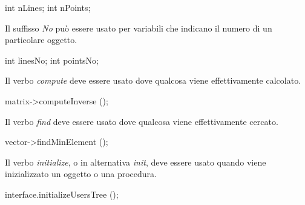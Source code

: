 \begin{minipage}[t]{\rbwidth}
\begin{RightCode}
int nLines;
int nPoints;
\end{RightCode}
\end{minipage}

Il suffisso \emph{No} può essere usato per variabili che indicano il numero di un particolare oggetto.

\begin{minipage}[t]{\rbwidth}
\begin{RightCode}
int linesNo;
int pointsNo;
\end{RightCode}
\end{minipage}

Il verbo \emph{compute} deve essere usato dove qualcosa viene effettivamente calcolato.

\begin{minipage}[t]{\rbwidth}
\begin{RightCode}
matrix->computeInverse ();
\end{RightCode}
\end{minipage} 

Il verbo \emph{find} deve essere usato dove qualcosa viene effettivamente cercato.

\begin{minipage}[t]{\rbwidth}
\begin{RightCode}
vector->findMinElement ();
\end{RightCode}
\end{minipage} 

Il verbo \emph{initialize}, o in alternativa \emph{init}, deve essere usato quando viene inizializzato un oggetto o una procedura.

\begin{minipage}[t]{\rbwidth}
\begin{RightCode}
interface.initializeUsersTree ();
\end{RightCode}
\end{minipage}

